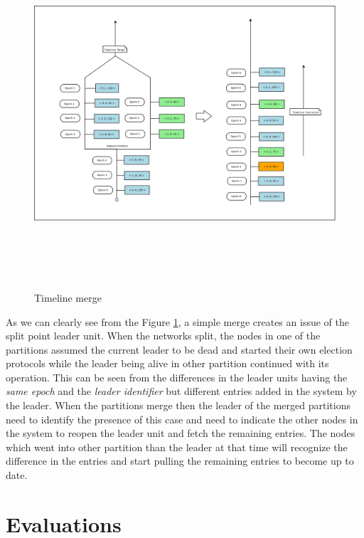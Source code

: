 \documentclass[12pt,a4paper,twoside,openright]{book}
\begin{document}
\begin{figure}
	\includegraphics[width=14cm, height= 13cm]{timeline-merge}
	
	\caption{Timeline merge}
	\label{fig:timelineMerge}
\end{figure}


\newpage As we can clearly see from the Figure \ref{fig:timelineMerge}, a simple merge creates an issue of the split point leader unit. When the networks split, the nodes in one of the partitions assumed the current leader to be dead and started their own election protocols while the leader being alive in other partition continued with its operation. This can be seen from the differences in the leader units having the \textit{same epoch} and the \textit{leader identifier}  but different entries added in the system by the leader. When the partitions merge then the leader of the merged partitions need to identify the presence of this case and need to indicate the other nodes in the system to reopen the leader unit and fetch the remaining entries. The nodes which went into other partition than the leader at that time will recognize the difference in the entries and start pulling the remaining entries to become up to date.


\chapter{Evaluations}
\label{chap:eval}
\end{document}
